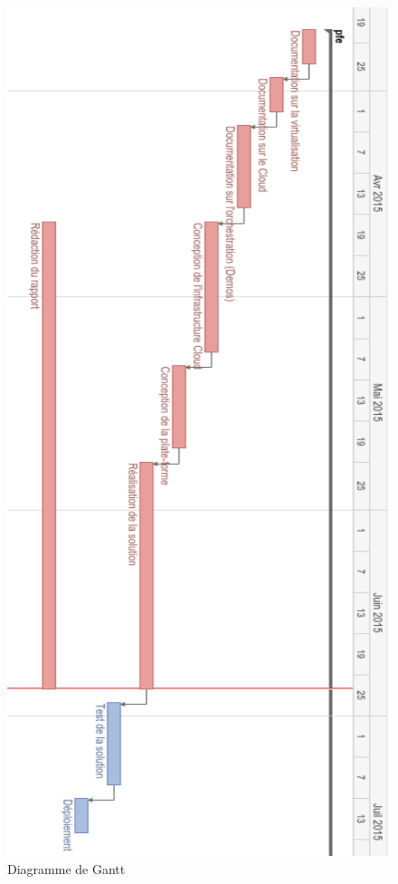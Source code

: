 \begin{onehalfspace}
\begin{figure}[H]
\centering
\includegraphics [scale=0.6]{chapitre1/assets/gantt.png}
\caption{Diagramme de Gantt}
\end{figure}


\end{onehalfspace}
